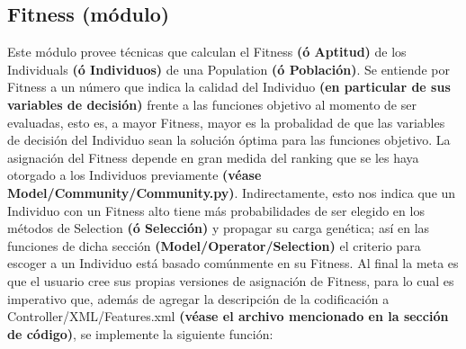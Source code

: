 \documentclass[class=report, crop=false]{standalone}
\begin{document}
\subsection{Fitness (módulo)}
\label{sec:a_2_3}
Este módulo provee técnicas que calculan el Fitness 
\textbf{(ó Aptitud)} de los Individuals \textbf{(ó Individuos)} 
de una Population \textbf{(ó Población)}.\medskip\break
Se entiende por Fitness a un número que indica la calidad del
Individuo \textbf{(en particular de sus variables de decisión)} 
frente a las funciones objetivo al momento de ser evaluadas, esto 
es, a mayor Fitness, mayor es la probalidad de que las variables 
de decisión del Individuo sean la solución óptima para las funciones 
objetivo.\medskip\break
La asignación del Fitness depende en gran medida del ranking que 
se les haya otorgado a los Individuos previamente 
\textbf{(véase Model/Community/Community.py)}.\break
Indirectamente, esto nos indica que un Individuo con un Fitness alto
tiene más probabilidades de ser elegido en los métodos de Selection 
\textbf{(ó Selección)} y propagar su carga genética; así en las 
funciones de dicha sección \textbf{(Model/Operator/Selection)} el 
criterio para escoger a un Individuo está basado comúnmente en su 
Fitness.\medskip\break
Al final la meta es que el usuario cree sus propias versiones de 
asignación de Fitness, para lo cual es imperativo que, además de 
agregar la descripción de la codificación a Controller/XML/Features.xml 
\textbf{(véase el archivo mencionado en la sección de código)}, se 
implemente la siguiente función:
\end{document}
